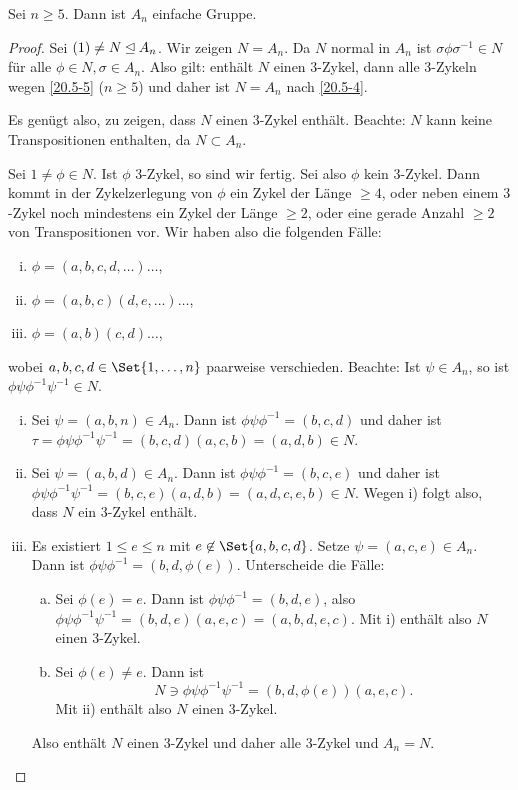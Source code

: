 \begin{st} \label{20.5-6}
	Sei $n \ge 5$.
	Dann ist $A_n$ einfache Gruppe.
	\begin{proof}
		Sei $(1) \neq N \mathbin{\trianglelefteq} A_n$.
		Wir zeigen $N = A_n$.
		Da $N$ normal in $A_n$ ist $\sigma \phi \sigma^{-1} \in N$ für alle $\phi \in N, \sigma \in A_n$.
		Also gilt: enthält $N$ einen $3$-Zykel, dann alle $3$-Zykeln wegen \ref{20.5-5} ($n \ge 5$) und daher ist $N = A_n$ nach \ref{20.5-4}.

		Es genügt also, zu zeigen, dass $N$ einen $3$-Zykel enthält.
		Beachte: $N$ kann keine Transpositionen enthalten, da $N \subset A_n$.

		Sei $1 \neq \phi \in N$.
		Ist $\phi$ $3$-Zykel, so sind wir fertig.
		Sei also $\phi$ kein $3$-Zykel.
		Dann kommt in der Zykelzerlegung von $\phi$ ein Zykel der Länge $\ge 4$, oder neben einem $3$-Zykel noch mindestens ein Zykel der Länge $\ge 2$, oder eine gerade Anzahl $\ge 2$ von Transpositionen vor.
		Wir haben also die folgenden Fälle:
		\begin{enumerate}[i)]
			\item
				$\phi = (a,b,c,d, \dotsc) \dotsc$,
			\item
				$\phi = (a,b,c)(d,e, \dotsc) \dotsc$,
			\item
				$\phi = (a,b)(c,d) \dotsc$,
		\end{enumerate}
		wobei $a, b, c, d \in \Set{1, \dotsc, n}$ paarweise verschieden.
		Beachte: Ist $\psi \in A_n$, so ist $\phi \psi \phi^{-1}\psi^{-1} \in N$.
		\begin{enumerate}[i)]
			\item
				Sei $\psi = (a,b,n) \in A_n$.
				Dann ist $\phi \psi \phi^{-1} = (b, c, d)$ und daher ist $\tau = \phi \psi \phi^{-1} \psi^{-1} = (b,c,d)(a,c,b) = (a,d,b) \in N$.
			\item
				Sei $\psi = (a,b,d) \in A_n$.
				Dann ist $\phi \psi \phi^{-1} = (b, c, e)$ und daher ist $\phi \psi \phi^{-1}\psi^{-1} = (b,c,e)(a,d,b) = (a, d, c, e, b) \in N$.
				Wegen i) folgt also, dass $N$ ein $3$-Zykel enthält.
			\item
				Es existiert $1 \le e \le n$ mit $e \not\in \Set{a, b, c, d}$.
				Setze $\psi = (a,c,e) \in A_n$.
				Dann ist $\phi \psi \phi^{-1} = (b, d, \phi(e))$.
				Unterscheide die Fälle:
				\begin{enumerate}[a)]
					\item
						Sei $\phi(e) = e$.
						Dann ist $\phi \psi \phi^{-1} = (b,d,e)$, also $\phi \psi \phi^{-1} \psi^{-1} = (b,d,e)(a,e,c) = (a,b,d,e,c)$.
						Mit i) enthält also $N$ einen $3$-Zykel.
					\item
						Sei $\phi(e) \neq e$.
						Dann ist
						\[
							N \ni \phi \psi \phi^{-1} \psi^{-1}
							= (b, d, \phi(e))(a, e, c).
						\]
						Mit ii) enthält also $N$ einen $3$-Zykel.
				\end{enumerate}
				Also enthält $N$ einen $3$-Zykel und daher alle $3$-Zykel und $A_n = N$.
		\end{enumerate}
	\end{proof}
\end{st}

